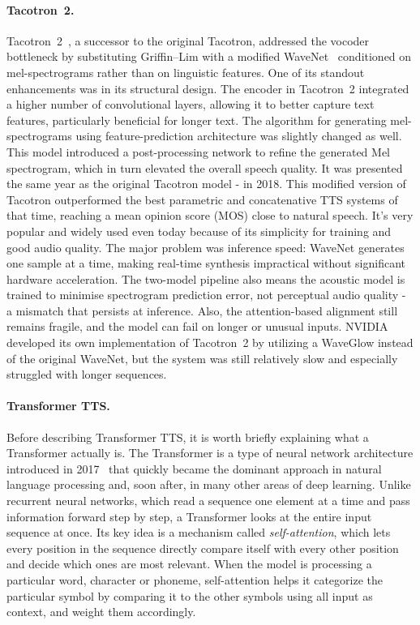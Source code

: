 \documentclass[
         english, %
    monochrome, %
]{VUMIFSEMasterThesis}
\begin{document}
\paragraph{Tacotron~2.}
Tacotron~2~\cite{shen2018natural}, a successor to the original Tacotron, addressed the vocoder bottleneck by substituting Griffin--Lim with a modified WaveNet~\cite{oord2016wavenet} conditioned on mel-spectrograms rather than on linguistic features.
One of its standout enhancements was in its structural design.
The encoder in Tacotron~2 integrated a higher number of convolutional layers, allowing it to better capture text features, particularly beneficial for longer text.
The algorithm for generating mel-spectrograms using feature-prediction architecture was slightly changed as well.
This model introduced a post-processing network to refine the generated Mel spectrogram, which in turn elevated the overall speech quality.
It was presented the same year as the original Tacotron model - in 2018.
This modified version of Tacotron outperformed the best parametric and concatenative TTS systems of that time, reaching a mean opinion score (MOS) close to natural speech.
It's very popular and widely used even today because of its simplicity for training and good audio quality.
The major problem was inference speed: WaveNet generates one sample at a time, making real-time synthesis impractical without significant hardware acceleration.
The two-model pipeline also means the acoustic model is trained to minimise spectrogram prediction error, not perceptual audio quality - a mismatch that persists at inference.
Also, the attention-based alignment still remains fragile, and the model can fail on longer or unusual inputs.
NVIDIA developed its own implementation of Tacotron~2 by utilizing a WaveGlow instead of the original WaveNet, but the system was still relatively slow and especially struggled with longer sequences.

\paragraph{Transformer TTS.}
Before describing Transformer TTS, it is worth briefly explaining what a Transformer actually is.
The Transformer is a type of neural network architecture introduced in 2017~\cite{vaswani2017attention} that quickly became the dominant approach in natural language processing and, soon after, in many other areas of deep learning.
Unlike recurrent neural networks, which read a sequence one element at a time and pass information forward step by step, a Transformer looks at the entire input sequence at once.
Its key idea is a mechanism called \emph{self-attention}, which lets every position in the sequence directly compare itself with every other position and decide which ones are most relevant.
When the model is processing a particular word, character or phoneme, self-attention helps it categorize the particular symbol by comparing it to the other symbols using all input as context, and weight them accordingly.
\end{document}
